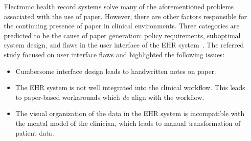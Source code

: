     \noindent Electronic health record systems solve many of the aforementioned problems associated with the use of paper. However, there are other factors responsible for the continuing presence of paper in clinical environments. Three categories are predicted to be the cause of paper generation: policy requirements, suboptimal system design, and flaws in the user interface of the EHR system~\cite{Saleem2009}. The referred study focused on user interface flaws and highlighted the following issues:
    \begin{itemize}
        \item Cumbersome interface design leads to handwritten notes on paper.
        \item The EHR system is not well integrated into the clinical workflow. This leads to paper-based workarounds which \emph{do} align with the workflow.
        \item The visual organization of the data in the EHR system is incompatible with the mental model of the clinician, which leads to manual transformation of patient data.
    \end{itemize}

